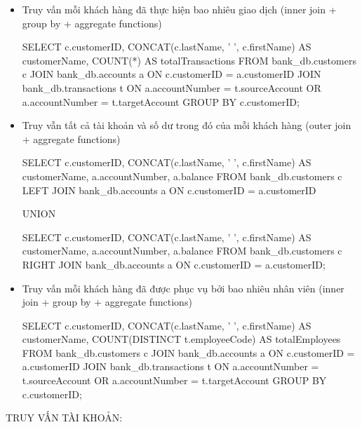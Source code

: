 \begin{itemize}
    \item Truy vấn mỗi khách hàng đã thực hiện bao nhiêu giao dịch (inner join + group by + aggregate functions)
    \begin{MySQLCode}
    SELECT 
        c.customerID,
        CONCAT(c.lastName, ' ', c.firstName) AS customerName,
        COUNT(*) AS totalTransactions
    FROM
	bank_db.customers c
    JOIN
        bank_db.accounts a ON c.customerID = a.customerID
    JOIN 
        bank_db.transactions t ON a.accountNumber = t.sourceAccount OR a.accountNumber = t.targetAccount
    GROUP BY 
        c.customerID;
    \end{MySQLCode}

    \item Truy vẫn tất cả tài khoản và số dư trong đó của mỗi khách hàng (outer join + aggregate functions)
    \begin{MySQLCode}
    SELECT 
        c.customerID,
        CONCAT(c.lastName, ' ', c.firstName) AS customerName,
        a.accountNumber,
        a.balance
    FROM 
        bank_db.customers c
    LEFT JOIN 
        bank_db.accounts a ON c.customerID = a.customerID

    UNION

    SELECT 
        c.customerID,
        CONCAT(c.lastName, ' ', c.firstName) AS customerName,
        a.accountNumber,
        a.balance
    FROM 
        bank_db.customers c
    RIGHT JOIN 
        bank_db.accounts a ON c.customerID = a.customerID;
    \end{MySQLCode}

    \item Truy vấn mỗi khách hàng đã được phục vụ bởi bao nhiêu nhân viên (inner join + group by + aggregate functions)
    \begin{MySQLCode}
    SELECT 
        c.customerID,
        CONCAT(c.lastName, ' ', c.firstName) AS customerName,
        COUNT(DISTINCT t.employeeCode) AS totalEmployees
    FROM 
        bank_db.customers c
    JOIN 
        bank_db.accounts a ON c.customerID = a.customerID
    JOIN 
        bank_db.transactions t ON a.accountNumber = t.sourceAccount OR a.accountNumber = t.targetAccount
    GROUP BY 
        c.customerID;
    \end{MySQLCode}

\end{itemize}
TRUY VẤN TÀI KHOẢN:
